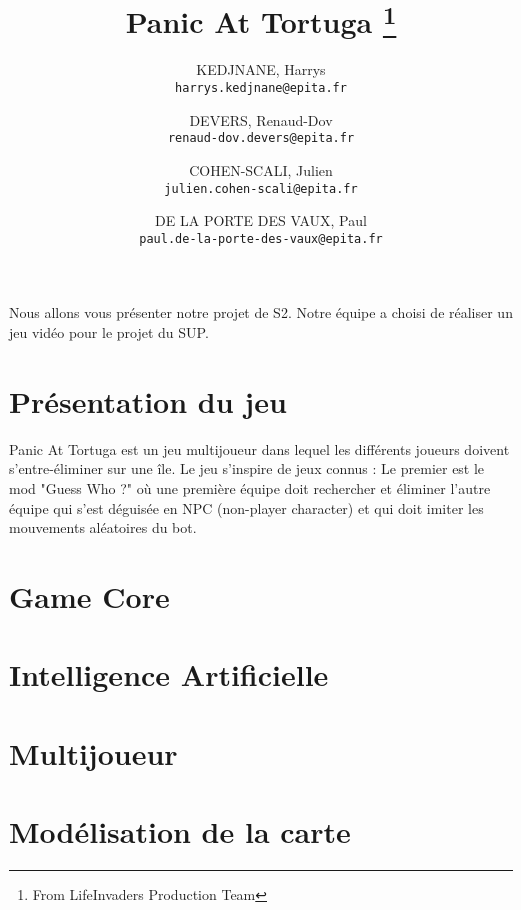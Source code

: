 \documentclass[12pt, letterpaper, twoside]{article}
\title{Panic At Tortuga \thanks{From LifeInvaders Production Team}}
\author{
    KEDJNANE, Harrys\\
    \texttt{harrys.kedjnane@epita.fr}
    \and
    DEVERS, Renaud-Dov\\
    \texttt{renaud-dov.devers@epita.fr}
    \and
    COHEN-SCALI, Julien\\
    \texttt{julien.cohen-scali@epita.fr}
    \and
    DE LA PORTE DES VAUX, Paul\\
    \texttt{paul.de-la-porte-des-vaux@epita.fr}
    
}
\begin{document}
\begin{titlepage}
\maketitle
\end{titlepage}

\begin{center}
Nous allons vous présenter notre projet de S2. Notre équipe a choisi de réaliser un jeu vidéo pour le projet du SUP.
\end{center}

\tableofcontents
\newpage


\section{Présentation du jeu}
\begin{flushleft}
Panic At Tortuga est un jeu multijoueur dans lequel les différents joueurs doivent s'entre-éliminer sur une île.
Le jeu s'inspire de jeux connus : Le premier est le mod "Guess Who ?" où une première équipe doit rechercher et éliminer l'autre équipe qui s'est déguisée en NPC (non-player character) et qui doit imiter les mouvements aléatoires du bot.
\end{flushleft}

\section{Game Core}


\section{Intelligence Artificielle}


\section{Multijoueur}


\section{Modélisation de la carte}

\end{document}
